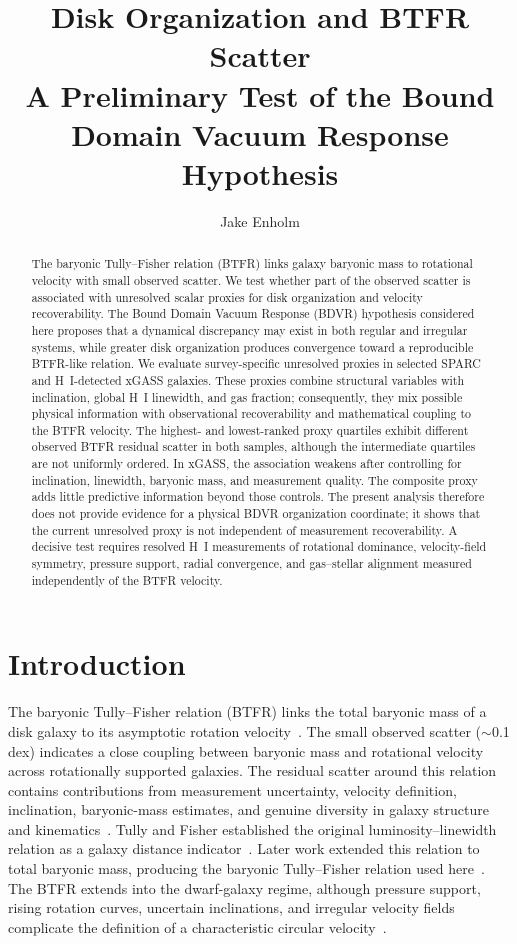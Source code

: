 \documentclass[11pt]{article}
\title{Disk Organization and BTFR Scatter\\A Preliminary Test of the Bound Domain Vacuum Response Hypothesis}
\author{Jake Enholm}
\date{}
\begin{document}
\maketitle

\begin{abstract}
The baryonic Tully--Fisher relation (BTFR) links galaxy baryonic mass to rotational velocity with small observed scatter. We test whether part of the observed scatter is associated with unresolved scalar proxies for disk organization and velocity recoverability. The Bound Domain Vacuum Response (BDVR) hypothesis considered here proposes that a dynamical discrepancy may exist in both regular and irregular systems, while greater disk organization produces convergence toward a reproducible BTFR-like relation. We evaluate survey-specific unresolved proxies in selected SPARC and H~I-detected xGASS galaxies. These proxies combine structural variables with inclination, global H~I linewidth, and gas fraction; consequently, they mix possible physical information with observational recoverability and mathematical coupling to the BTFR velocity. The highest- and lowest-ranked proxy quartiles exhibit different observed BTFR residual scatter in both samples, although the intermediate quartiles are not uniformly ordered. In xGASS, the association weakens after controlling for inclination, linewidth, baryonic mass, and measurement quality. The composite proxy adds little predictive information beyond those controls. The present analysis therefore does not provide evidence for a physical BDVR organization coordinate; it shows that the current unresolved proxy is not independent of measurement recoverability. A decisive test requires resolved H~I measurements of rotational dominance, velocity-field symmetry, pressure support, radial convergence, and gas--stellar alignment measured independently of the BTFR velocity.
\end{abstract}

\section{Introduction}

The baryonic Tully--Fisher relation (BTFR) links the total baryonic mass of a disk galaxy to its asymptotic rotation velocity~\cite{mcGaugh2012}. The small observed scatter ($\sim$0.1 dex) indicates a close coupling between baryonic mass and rotational velocity across rotationally supported galaxies. The residual scatter around this relation contains contributions from measurement uncertainty, velocity definition, inclination, baryonic-mass estimates, and genuine diversity in galaxy structure and kinematics~\cite{bradford2016}. Tully and Fisher established the original luminosity--linewidth relation as a galaxy distance indicator~\cite{tully1977}. Later work extended this relation to total baryonic mass, producing the baryonic Tully--Fisher relation used here~\cite{courteau2014, mcGaugh2012}. The BTFR extends into the dwarf-galaxy regime, although pressure support, rising rotation curves, uncertain inclinations, and irregular velocity fields complicate the definition of a characteristic circular velocity~\cite{swaters2009, deblok2010}.
\end{document}
